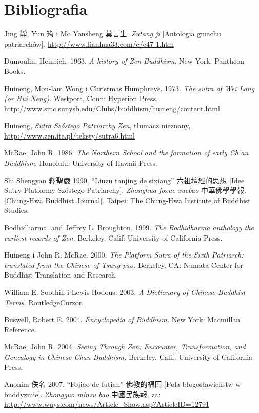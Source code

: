 \onecolumn
\section*{Bibliografia}

Jing 靜, Yun 筠 i Mo Yansheng 莫言生. \textit{Zutang ji} [Antologia gmachu patriarchów]. \url{http://www.lianhua33.com/c/c47-1.htm}

Dumoulin, Heinrich. 1963. \textit{A history of Zen Buddhism}. New York: Pantheon Books.

Huineng, Mou-lam Wong i Christmas Humphreys. 1973. \textit{The sutra of Wei Lang (or Hui Neng)}. Westport, Conn: Hyperion Press. \url{http://www.sinc.sunysb.edu/Clubs/buddhism/huineng/content.html}

Huineng, \textit{Sutra Szóstego Patriarchy Zen}, tłumacz nieznany, \url{http://www.zen.ite.pl/teksty/sutra6.html}

McRae, John R. 1986. \textit{The Northern School and the formation of early Ch'an Buddhism}. Honolulu: University of Hawaii Press.

Shi Shengyan 釋聖嚴 1990. ``Liuzu tanjing de sixiang'' 六祖壇經的思想 [Idee Sutry Platformy Szóstego Patriarchy]. \textit{Zhonghua foxue xuebao} 中華佛學學報. [Chung-Hwa Buddhist Journal]. Taipei: The Chung-Hwa Institute of Buddhist Studies.

Bodhidharma, and Jeffrey L. Broughton. 1999. \textit{The Bodhidharma anthology the earliest records of Zen}. Berkeley, Calif: University of California Press.

Huineng i John R. McRae. 2000. \textit{The Platform Sutra of the Sixth Patriarch: translated from the Chinese of Tsung-pao.} Berkeley, CA: Numata Center for Buddhist Translation and Research.

William E. Soothill i Lewis Hodous. 2003. \textit{A Dictionary of Chinese Buddhist Terms.} RoutledgeCurzon.%

Buswell, Robert E. 2004. \textit{Encyclopedia of Buddhism.} New York: Macmillan Reference.

McRae, John R. 2004. \textit{Seeing Through Zen: Encounter, Transformation, and Genealogy in Chinese Chan Buddhism.} Berkeley, Calif: University of California Press.

Anonim 佚名 2007. ``Fojiao de futian'' 佛教的福田 [Pola błogosławieństw w buddyzmie]. \textit{Zhongguo minzu bao} 中國民族報, za: \url{http://www.wuys.com/news/Article_Show.asp?ArticleID=12791}

